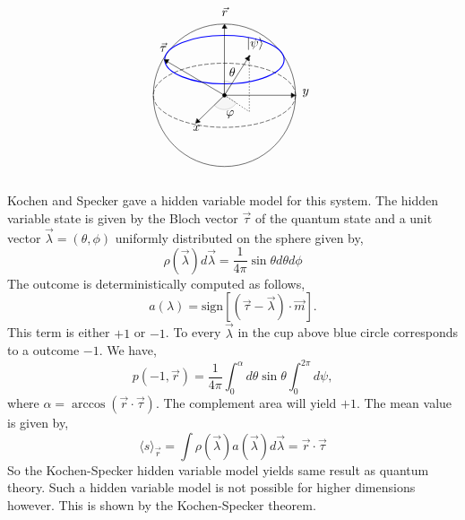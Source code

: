 \documentclass[11pt]{report}
\begin{document}
\[
\begin{tikzpicture}[line cap=round, line join=round, >=Triangle, scale=1]
	\clip(-2.19,-2.49) rectangle (2.66,2.58);
	\draw [shift={(0,0)}, lightgray, fill, fill opacity=0.1] (0,0) -- (56.7:0.4) arc (56.7:90.:0.4) -- cycle;
	\draw [shift={(0,0)}, lightgray, fill, fill opacity=0.1] (0,0) -- (-135.7:0.4) arc (-135.7:-33.2:0.4) -- cycle;
	\draw(0,0) circle (2cm);
	\draw [rotate around={0.:(0.,0.)},dash pattern=on 3pt off 2pt] (0,0) ellipse (2cm and 0.9cm);
	\draw [rotate around={0.:(0.,0.)}, blue, thick, dash pattern=on 4pt off 0pt] (0,1) ellipse (1.68cm and 0.68cm);
	\draw [->] (0,0)-- (0.70,1.1);
	\draw [->] (0,0) -- (0,2);
	\draw [->] (0,0) -- (-0.81,-0.79);
	\draw [->] (0,0) -- (-1.7,1);
	\draw [->] (0,0) -- (2,0);
	\draw [dotted] (0.7,1)-- (0.7,-0.46);
	\draw [dotted] (0,0)-- (0.7,-0.46);
	\draw (-0.08,-0.3) node[anchor=north west] {$\varphi$};
	\draw (0.01,0.9) node[anchor=north west] {$\theta$};
	\draw (-1.01,-0.72) node[anchor=north west] {$ {{x}}$};
	\draw (2.07,0.3) node[anchor=north west] {$ {{y}}$};
	\draw (-0.2,2.6) node[anchor=north west] {$ \vec{r}$};
	\draw (0.5,1.75) node[anchor=north west] {$|\psi\rangle$};
	\draw (-1.5,1.1) node[anchor=south east] {$\vec{\tau}$};
	\scriptsize
	\draw [fill] (0,0) circle (1.5pt);
	\draw [fill] (0.7,1.1) circle (0.5pt);
\end{tikzpicture}
\]
Kochen and Specker gave a hidden variable model for this system. The hidden variable state is given by the Bloch vector $\vec{\tau}$ of the quantum state and a unit vector $\vec{\lambda}=(\theta,\phi)$ uniformly distributed on the sphere given by,
$$\rho(\vec\lambda)d\vec\lambda=\frac{1}{4\pi}\sin \theta d\theta d\phi$$
The outcome is deterministically computed as follows,
$$a(\lambda)=\text{sign} [(\vec{\tau}-\vec\lambda)\cdot \vec{m}].$$
This term is either $+1$ or $-1$. To every $\vec\lambda$ in the cup above blue circle corresponds to a outcome $-1$. We have,
$$p(-1,\vec{r})=\frac{1}{4\pi}\int_{0}^{\alpha} d\theta \sin\theta \int_{0}^{2\pi}d\psi,$$
where $\alpha=\arccos(\vec{r}\cdot \vec{\tau})$. The complement area will yield $+1$. The mean value is given by,
$$\langle s\rangle_{\vec{r}}=\int \rho(\vec\lambda)a(\vec\lambda)d\vec\lambda=\vec{r}\cdot\vec{\tau}$$
So the Kochen-Specker hidden variable model yields same result as quantum theory. Such a hidden variable model is not possible for higher dimensions however. This is shown by the Kochen-Specker theorem.
\end{document}
